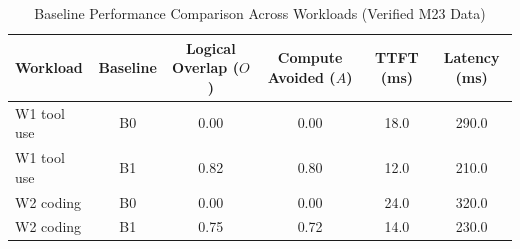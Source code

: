 \begin{table}[t]
\centering
\caption{Baseline Performance Comparison Across Workloads (Verified M23 Data)}
\label{tab:baselines}
\begin{tabular}{lccccc}
\toprule
\textbf{Workload} & \textbf{Baseline} & \textbf{Logical Overlap ($O$)} & \textbf{Compute Avoided ($A$)} & \textbf{TTFT (ms)} & \textbf{Latency (ms)} \\
\midrule
W1 tool use & B0 & 0.00 & 0.00 & 18.0 & 290.0 \\
W1 tool use & B1 & 0.82 & 0.80 & 12.0 & 210.0 \\
W2 coding & B0 & 0.00 & 0.00 & 24.0 & 320.0 \\
W2 coding & B1 & 0.75 & 0.72 & 14.0 & 230.0 \\
\bottomrule
\end{tabular}
\end{table}
